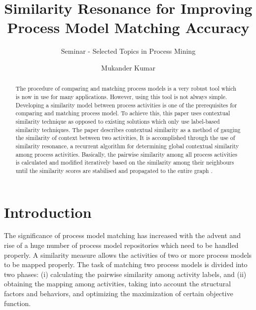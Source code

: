 \documentclass[runningheads]{llncs}
\begin{document}
\title{Similarity Resonance for Improving Process Model Matching Accuracy}
\subtitle{Seminar - Selected Topics in Process Mining}
\author{Mukander Kumar}

\maketitle     
\begin{abstract}
The procedure of comparing and matching process models is a very robust tool which is now in use for many applications. However, using this tool is not always simple. Developing a similarity model between process activities is one of the prerequisites for comparing and matching process model. To achieve this, this paper uses contextual similarity technique as opposed to existing solutions which only use label-based similarity techniques. The paper describes contextual similarity as a method of gauging the similarity of context between two activities, It is accomplished through the use of similarity resonance, a recurrent algorithm for determining global contextual similarity among process activities. Basically, the pairwise similarity among all process activities is calculated and modified iteratively based on the similarity among their neighbours until the similarity scores are stabilised and propagated to the entire graph \cite{ref2}.
\end{abstract}
%
\section{Introduction}
The significance of process model matching has increased with the advent and rise of a huge number of process model repositories which need to be handled properly\cite{ref3}. A similarity measure allows the activities of two or more process models to be mapped properly. The task of matching two process models is divided into two phases: (i) calculating the pairwise similarity among activity labels, and (ii) obtaining the mapping among activities, taking into account the structural factors and behaviors, and optimizing the maximization of certain objective function.\newline 
\end{document}
